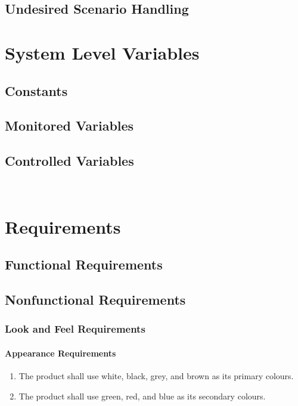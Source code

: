 \documentclass[12pt]{article}
\begin{document}
\subsection{Undesired Scenario Handling}

\section{System Level Variables}
\subsection{Constants}
\subsection{Monitored Variables}
\subsection{Controlled Variables}

~\newpage

\section{Requirements}
\subsection{Functional Requirements}
\subsection{Nonfunctional Requirements}

\setcounter{vnvSectionNfr}{1}

\setcounter{nfrNum}{1}

\subsubsection{Look and Feel Requirements}
\label{NFR_LF}
\paragraph{Appearance Requirements}
\begin{enumerate}[{LF}1., leftmargin=2\parindent]
    \item The product shall use white, black, grey, and brown as its primary colours.
    \item The product shall use green, red, and blue as its secondary colours.
\end{enumerate}
\end{document}
